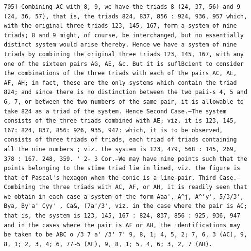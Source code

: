\documentclass[11pt,a4paper]{book}
\begin{document}
\newpage
\setcounter{page}{573}
\begin{verbatim}
705] Combining AC with 8, 9, we have the triads 8 (24, 37, 56) and 9 (24, 36, 57), that is, the triads 824, 837, 856 : 924, 936, 957 which, with the original three triads 123, 145, 167, form a system of nine triads; 8 and 9 might, of course, be interchanged, but no essentially distinct system would arise thereby. Hence we have a system of nine triads by combining the original three triads 123, 145, 167, with any one of the sixteen pairs AG, AE, &c. But it is suflBcient to consider the combinations of the three triads with each of the pairs AC, AE, AF, AH; in fact, these are the only systems which contain the triad 824; and since there is no distinction between the two paii-s 4, 5 and 6, 7, or between the two numbers of the same pair, it is allowable to take 824 as a triad of the system. Hence Second Case.—The system consists of the three triads combined with AE; viz. it is 123, 145, 167: 824, 837, 856: 926, 935, 947: which, it is to be observed, consists of three triads of triads, each triad of triads containing all the nine numbers ; viz. the system is 123, 479, 568 : 145, 269, 378 : 167. 248, 359. ' 2- 3 Cor.—We may have nine points such that the points belonging to the stime triad lie in lined, viz. the figure is that of Pascal's hexagon when the conic is a line-pair. Third Case.—Combining the three triads with AC, AF, or AH, it is readily seen that we obtain in each case a system of the form Aaa', A^j, A^'y', 5/3/3', Bya, By'a' Cyy' , Ca&, (7a'/3', viz. in the case where the pair is AC; that is, the system is 123, 145, 167 : 824, 837, 856 : 925, 936, 947 and in the cases where the pair is AF or AH, the identifications may be taken to be ABC o /3 7 a' /3' 7' 9, 8, 1; 4, 5, 2; 7, 6, 3 (AC), 9, 8, 1; 2, 3, 4; 6, 77~5 (AF), 9, 8, 1; 5, 4, 6; 3, 2, 7 (AH). 
\end{verbatim}
\end{document}
